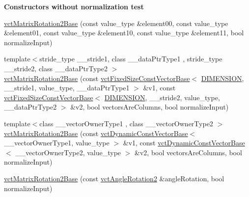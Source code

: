 \begin{Indent}{\bf Constructors without normalization test}
{\begin{DoxyItemize}
\end{DoxyItemize}}\begin{DoxyCompactItemize}
\item 
\hyperlink{classvct_matrix_rotation2_base_ad679cdbef92181ab02a7d054ca4f72a5}{vct\+Matrix\+Rotation2\+Base} (const value\+\_\+type \&element00, const value\+\_\+type \&element01, const value\+\_\+type \&element10, const value\+\_\+type \&element11, bool normalize\+Input)
\item 
{\footnotesize template$<$stride\+\_\+type \+\_\+\+\_\+stride1, class \+\_\+\+\_\+data\+Ptr\+Type1 , stride\+\_\+type \+\_\+\+\_\+stride2, class \+\_\+\+\_\+data\+Ptr\+Type2 $>$ }\\\hyperlink{classvct_matrix_rotation2_base_add62331eccc1a4496afb02be3a7100e7}{vct\+Matrix\+Rotation2\+Base} (const \hyperlink{classvct_fixed_size_const_vector_base}{vct\+Fixed\+Size\+Const\+Vector\+Base}$<$ \hyperlink{classvct_matrix_rotation2_base_ac10279ed12ec787b1a4833ea02771348acefb9855f54f0cfd782e785c9083e592}{D\+I\+M\+E\+N\+S\+I\+O\+N}, \+\_\+\+\_\+stride1, value\+\_\+type, \+\_\+\+\_\+data\+Ptr\+Type1 $>$ \&v1, const \hyperlink{classvct_fixed_size_const_vector_base}{vct\+Fixed\+Size\+Const\+Vector\+Base}$<$ \hyperlink{classvct_matrix_rotation2_base_ac10279ed12ec787b1a4833ea02771348acefb9855f54f0cfd782e785c9083e592}{D\+I\+M\+E\+N\+S\+I\+O\+N}, \+\_\+\+\_\+stride2, value\+\_\+type, \+\_\+\+\_\+data\+Ptr\+Type2 $>$ \&v2, bool vectors\+Are\+Columns, bool normalize\+Input)
\item 
{\footnotesize template$<$class \+\_\+\+\_\+vector\+Owner\+Type1 , class \+\_\+\+\_\+vector\+Owner\+Type2 $>$ }\\\hyperlink{classvct_matrix_rotation2_base_a279e93163ce3c90dc1abe1e7183d1df7}{vct\+Matrix\+Rotation2\+Base} (const \hyperlink{classvct_dynamic_const_vector_base}{vct\+Dynamic\+Const\+Vector\+Base}$<$ \+\_\+\+\_\+vector\+Owner\+Type1, value\+\_\+type $>$ \&v1, const \hyperlink{classvct_dynamic_const_vector_base}{vct\+Dynamic\+Const\+Vector\+Base}$<$ \+\_\+\+\_\+vector\+Owner\+Type2, value\+\_\+type $>$ \&v2, bool vectors\+Are\+Columns, bool normalize\+Input)
\item 
\hyperlink{classvct_matrix_rotation2_base_a7814957ece4e946432467a0cc18df077}{vct\+Matrix\+Rotation2\+Base} (const \hyperlink{classvct_angle_rotation2}{vct\+Angle\+Rotation2} \&angle\+Rotation, bool normalize\+Input)
\end{DoxyCompactItemize}
\end{Indent}
